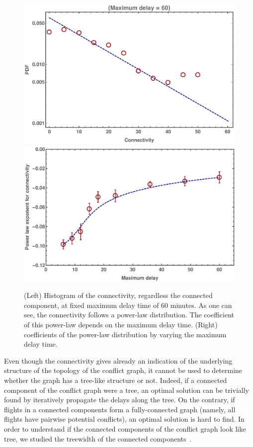 \begin{figure}
  \includegraphics[width=0.95\columnwidth]{pics/instances/connectivity_pdf.pdf}
  \hspace{30pt}
  \includegraphics[width=0.95\columnwidth]{pics/instances/connectivity_pl.pdf}
  \caption{(Left) Histogram of the connectivity, regardless the
  connected component, at fixed maximum delay time of $60$ minutes. As one can see, the
  connectivity follows a power-law distribution. The coefficient of this
  power-law depends on the maximum delay time. (Right) coefficients of the
  power-law distribution by varying the maximum delay time.}
\label{fig:pl_cc}
\end{figure}

Even though the connectivity gives already an indication of the underlying
structure of the topology of the conflict graph, it cannot be used to determine
whether the graph has a tree-like structure or not. Indeed, if a connected
component of the conflict graph were a tree, an optimal solution can be
trivially found by iteratively propagate the delays along the tree. On the
contrary, if flights in a connected components form a fully-connected graph
(namely, all flights have pairwise potential conflicts), an optimal solution is
hard to find. In order to understand if the connected components of the conflict
graph look like tree, we studied the treewidth of the connected
components~\cite{bertele1972, halin1976s}.\\

